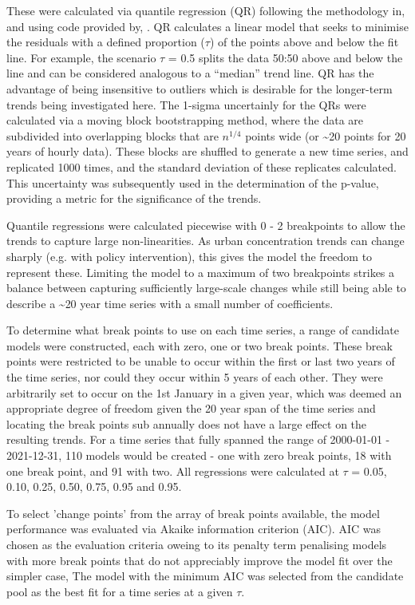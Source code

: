 \documentclass[journal abbreviation, manuscript]{copernicus}
\begin{document}
These were calculated via quantile regression (QR) following the methodology in, and using code provided by, \cite{chang2023guidancenotebeststatistical}. QR calculates a linear model that seeks to minimise the residuals with a defined proportion ($\tau$) of the points above and below the fit line. For example, the scenario $\tau$ = 0.5 splits the data 50:50 above and below the line and can be considered analogous to a “median” trend line. QR has the advantage of being insensitive to outliers which is desirable for the longer-term trends being investigated here. The 1-sigma uncertainly for the QRs were calculated via a moving block bootstrapping method, where the data are subdivided into overlapping blocks that are $n^{1/4}$ points wide (or \textasciitilde{20} points for 20 years of hourly data). These blocks are shuffled to generate a new time series, and replicated 1000 times, and the standard deviation of these replicates calculated. This uncertainty was subsequently used in the determination of the p-value, providing a metric for the significance of the trends. 

Quantile regressions were calculated piecewise with 0 - 2 breakpoints to allow the trends to capture large non-linearities. As urban concentration trends can change sharply (e.g. with policy intervention), this gives the model the freedom to represent these. Limiting the model to a maximum of two breakpoints strikes a balance between capturing sufficiently large-scale changes while still being able to describe a \textasciitilde{20} year time series with a small number of coefficients.

To determine what break points to use on each time series, a range of candidate models were constructed, each with zero, one or two break points. These break points were restricted to be unable to occur within the first or last two years of the time series, nor could they occur within 5 years of each other. They were arbitrarily set to occur on the 1st January in a given year, which was deemed an appropriate degree of freedom given the 20 year span of the time series and locating the break points sub annually does not have a large effect on the resulting trends. For a time series that fully spanned the range of 2000-01-01 - 2021-12-31, 110 models would be created - one with zero break points, 18 with one break point, and 91 with two. All regressions were calculated at $\tau$ = 0.05, 0.10, 0.25, 0.50, 0.75, 0.95 and 0.95.

To select 'change points' from the array of break points available, the model performance was evaluated via Akaike information criterion (AIC). AIC was chosen as the evaluation criteria oweing to its penalty term penalising models with more break points that do not appreciably improve the model fit over the simpler case, The model with the minimum AIC was selected from the candidate pool as the best fit for a time series at a given $\tau$. 
\end{document}

